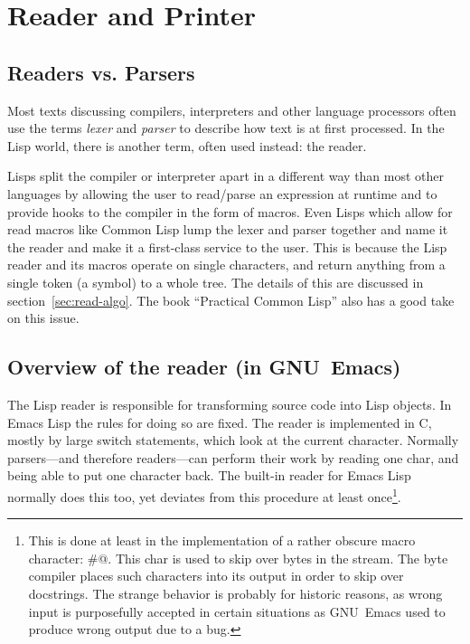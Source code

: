 \documentclass[a4paper,10pt,twoside]{report}
\newcommand{\el}{Emacs Lisp}
\newcommand{\cl}{Common Lisp}
\newcommand{\emacs}{GNU~Emacs}
\begin{document}
\chapter{Reader and Printer}
\label{chapter:reader-printer}

\section{Readers vs. Parsers}
\label{subsec:readers-vs-parsers}

Most texts discussing compilers, interpreters and other language processors
often use the terms \emph{lexer} and \emph{parser} to describe how text is at
first processed.  In the Lisp world, there is another term, often used instead:
the reader.

Lisps split the compiler or interpreter apart in a different way than most other
languages by allowing the user to read/parse an expression at runtime and to
provide hooks to the compiler in the form of macros.  Even Lisps which allow for
read macros like \cl{} lump the lexer and parser together and name it the reader
and make it a first-class service to the user.  This is because the Lisp reader
and its macros operate on single characters, and return anything from a single
token (a symbol) to a whole tree.  The details of this are discussed in
section~\ref{sec:read-algo}.  The book ``Practical Common Lisp'' also has a good
take on this issue.\cite[Chapter 4, Section ``Breaking Open the Black
Box'']{pcl}

\section{Overview of the reader (in \emacs{})}
\label{subsec:reader}

The Lisp reader is responsible for transforming source code into Lisp objects.
In \el{} the rules for doing so are fixed.  The reader is implemented in C,
mostly by large switch statements, which look at the current character.
Normally parsers---and therefore readers---can perform their work by reading one
char, and being able to put one character back.  The built-in reader for \el{}
normally does this too, yet deviates from this procedure at least
once\footnote{This is done at least in the implementation of a rather obscure
  macro character: \#@.  This char is used to skip over bytes in the stream.
  The byte compiler places such characters into its output in order to skip over
  docstrings.  The strange behavior is probably for historic reasons, as wrong
  input is purposefully accepted in certain situations as \emacs{} used to
  produce wrong output due to a bug.}.
\end{document}
